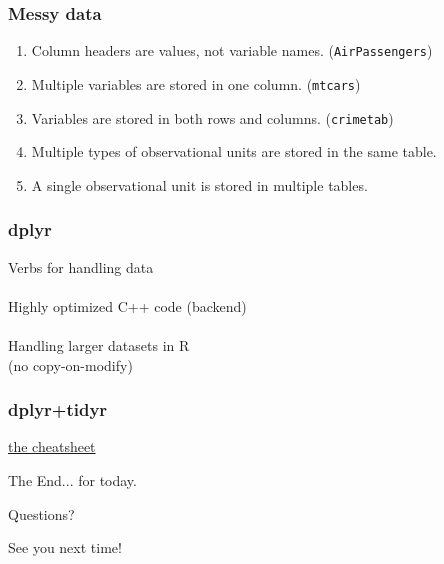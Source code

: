 \documentclass{beamer}
\begin{document}
\begin{frame}
	\frametitle{Messy data}
	\begin{center}
		\begin{enumerate}
			\item Column headers are values, not variable names. 
			(\texttt{AirPassengers})
			\item Multiple variables are stored in one column. (\texttt{mtcars})
			\item Variables are stored in both rows and columns. 
			(\texttt{crimetab})
			\item Multiple types of observational units are stored in the same 
			table.
			\item A single observational unit is stored in multiple tables.
		\end{enumerate}
	\end{center}
\end{frame}

\begin{frame}
	\frametitle{dplyr}
	\begin{center}
		\begin{enumerate}
			Verbs for handling data\\~\\
			Highly optimized C++ code (backend)\\~\\
			Handling larger datasets in R\\
			(no copy-on-modify)
		\end{enumerate}
	\end{center}
\end{frame}

\begin{frame}
	\frametitle{dplyr+tidyr}
	\begin{center}
		\href{https://www.rstudio.com/wp-content/uploads/2015/02/data-wrangling-cheatsheet.pdf}
			{the cheatsheet}
	\end{center}
\end{frame}


\begin{frame}
\Huge{\centerline{The End... for today.}}
\Huge{\centerline{Questions?}}
\Huge{\centerline{See you next time!}}
\end{frame}

\end{document}
